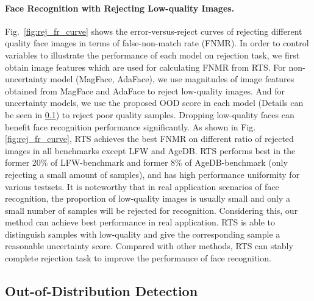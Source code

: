 \documentclass[letterpaper]{article} %
\begin{document}
\paragraph{Face Recognition with Rejecting Low-quality Images.}
Fig.~\ref{fig:rej_fr_curve} shows the error-versus-reject curves of rejecting different quality face images in terms of false-non-match rate (FNMR). In order to control variables to illustrate the performance of each model on rejection task, we first obtain image features which are used for calculating FNMR from RTS. For non-uncertainty model (MagFace, AdaFace), we use magnitudes of image features obtained from MagFace and AdaFace to reject low-quality images. And for uncertainty models, we use the proposed OOD score in each model (Details can be seen in \ref{ssec:ood}) to reject poor quality samples. Dropping low-quality faces can benefit face recognition performance significantly. As shown in Fig.\ref{fig:rej_fr_curve}, RTS achieves the best FNMR on different ratio of rejected images in all benchmarks except LFW and AgeDB. RTS performs best in the former 20\% of LFW-benchmark and former 8\% of AgeDB-benchmark (only rejecting a small amount of samples), and has high performance uniformity for various testsets. It is noteworthy that in real application scenarios of face recognition, the proportion of low-quality images is usually small and only a small number of samples will be rejected for recognition. Considering this, our method can achieve best performance in real application. RTS is able to distinguish samples with low-quality and give the corresponding sample a reasonable uncertainty score. Compared with other methods, RTS can stably complete rejection task to improve the performance of face recognition.










\subsection{Out-of-Distribution Detection}
\label{ssec:ood}
\end{document}
